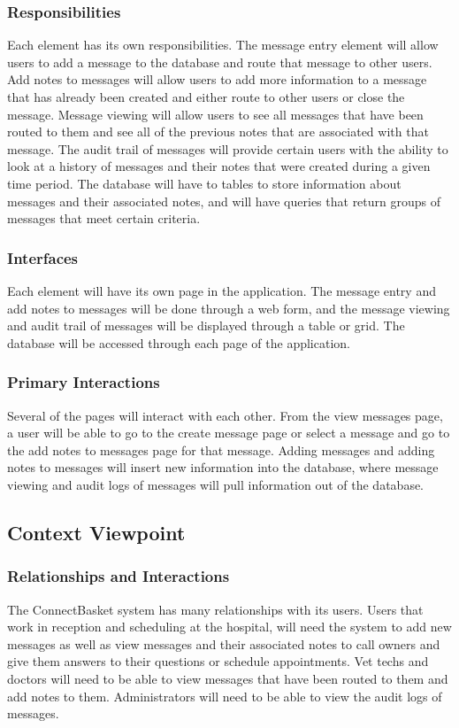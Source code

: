 \documentclass[onecolumn, draftclsnofoot,10pt, compsoc]{IEEEtran}
\begin{document}
\subsubsection{Responsibilities}
Each element has its own responsibilities. The message entry element will allow users to add a message to the database and route that message to other users. Add notes to messages will allow users to add more information to a message that has already been created and either route to other users or close the message. Message viewing will allow users to see all messages that have been routed to them and see all of the previous notes that are associated with that message. The audit trail of messages will provide certain users with the ability to look at a history of messages and their notes that were created during a given time period. The database will have to tables to store information about messages and their associated notes, and will have queries that return groups of messages that meet certain criteria.
\subsubsection{Interfaces}
Each element will have its own page in the application. The message entry and add notes to  messages will be done through a web form, and the message viewing and audit trail of messages will be displayed through a table or grid. The database will be accessed through each page of the application. 

\subsubsection{Primary Interactions}
Several of the pages will interact with each other. From the view messages page, a user will be able to go to the create message page or select a message and go to the add notes to messages page for that message. Adding messages and adding notes to messages will insert new information into the database, where message viewing and audit logs of messages will pull information out of the database.

\subsection{Context Viewpoint}

\subsubsection{Relationships and Interactions}
The ConnectBasket system has many relationships with its users. Users that work in reception and scheduling at the hospital, will need the system to add new messages as well as view messages and their associated notes to call owners and give them answers to their questions or schedule appointments. Vet techs and doctors will need to be able to view messages that have been routed to them and add notes to them. Administrators will need to be able to view the audit logs of messages.
\end{document}
